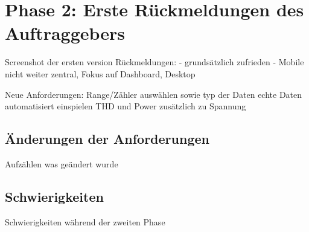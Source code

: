 \section{Phase 2: Erste Rückmeldungen des Auftraggebers}
Screenshot der ersten version
Rückmeldungen:
- grundsätzlich zufrieden
- Mobile nicht weiter zentral, Fokus auf Dashboard, Desktop

Neue Anforderungen:
Range/Zähler auswählen sowie typ der Daten
echte Daten automatisiert einspielen
THD und Power zusätzlich zu Spannung

\subsection{Änderungen der Anforderungen}
Aufzählen was geändert wurde
\subsection{Schwierigkeiten}
Schwierigkeiten während der zweiten Phase
